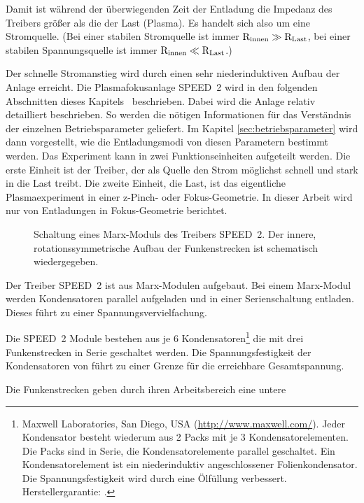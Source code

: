 Damit ist während der überwiegenden Zeit der Entladung die Impedanz des
Treibers größer als die der Last (Plasma). Es handelt sich also um eine
Stromquelle. (Bei einer stabilen Stromquelle ist immer $\rm R_{\rm
innen} \gg \rm R_{\rm Last}$, bei einer stabilen Spannungsquelle ist
immer $\rm R_{\rm innen} \ll \rm R_{\rm Last}$.)
\par
Der schnelle Stromanstieg wird durch einen sehr niederinduktiven Aufbau
der Anlage erreicht. Die Plasmafokusanlage SPEED~2 wird in den
folgenden Abschnitten dieses Kapitels \thesection\ beschrieben. Dabei
wird die Anlage relativ detailliert beschrieben. So werden die nötigen
Informationen für das Verständnis der einzelnen Betriebsparameter
geliefert. Im Kapitel \vref{sec:betriebsparameter} wird dann
vorgestellt, wie die Entladungsmodi von diesen Parametern bestimmt
werden.
%
%
Das Experiment kann in zwei Funktionseinheiten aufgeteilt werden. Die erste
Einheit ist der Treiber, der als Quelle den Strom möglichst schnell und stark
in die Last treibt. Die zweite Einheit, die Last, ist das eigentliche
Plasmaexperiment in einer z-Pinch- oder Fokus-Geometrie. In dieser Arbeit wird
nur von Entladungen in Fokus-Geometrie berichtet.
%
\par
\begin{figure}[H]
  \center
  \caption{Schaltung eines Marx-Moduls des Treibers SPEED~2.
      Der innere, rotationssymmetrische Aufbau der
      Funkenstrecken ist schematisch wiedergegeben.}
  \label{fig:modul}
\end{figure}
%
\par
Der Treiber SPEED~2 ist aus Marx-Modulen aufgebaut. Bei einem
Marx-Modul werden Kondensatoren parallel aufgeladen und in einer
Serienschaltung entladen. Dieses führt zu einer
Spannungsvervielfachung.
\par
Die SPEED~2 Module bestehen aus je 6
Kondensatoren\footnote{Maxwell Laboratories, San Diego, USA
(\url{http://www.maxwell.com/}). Jeder Kondensator besteht
wiederum aus 2 Packs mit je 3 Kondensatorelementen. Die Packs sind
in Serie, die Kondensatorelemente parallel geschaltet. Ein
Kondensatorelement ist ein niederinduktiv angeschlossener
Folienkondensator. Die Spannungsfestigkeit wird durch eine
Ölfüllung verbessert. Herstellergarantie: .} die mit
drei Funkenstrecken in Serie geschaltet werden. Die
Spannungsfestigkeit der Kondensatoren von  führt zu
einer Grenze für die erreichbare Gesamtspannung.
\par
Die Funkenstrecken geben durch ihren Arbeitsbereich eine untere
